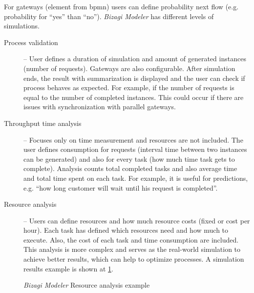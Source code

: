 For gateways (element from \gls{bpmn}) users can define probability next flow (e.g. probability for ``yes'' than ``no''). \textit{Bizagi Modeler} has different levels of simulations.
    \begin{description}
        \item[Process validation] -- User defines a duration of simulation and amount of generated instances (number of requests). Gateways are also configurable. After simulation ends, the result with summarization is displayed and the user can check if process behaves as expected. For example, if the number of requests is equal to the number of completed instances. This could occur if there are issues with synchronization with parallel gateways.
        \item[Throughput time analysis] -- Focuses only on time measurement and resources are not included. The user defines consumption for requests (interval time between two instances can be generated) and also for every task (how much time task gets to complete). Analysis counts total completed tasks and also average time and total time spent on each task. For example, it is useful for predictions, e.g. ``how long customer will wait until his request is completed''.
        \item[Resource analysis] -- Users can define resources and how much resource costs (fixed or cost per hour). Each task has defined which resources need and how much to execute. Also, the cost of each task and time consumption are included. This analysis is more complex and serves as the real-world simulation to achieve better results, which can help to optimize processes. A simulation results example is shown at \cref{fig:bizagi-example}.
    \end{description}

\begin{figure}[ht!]
    \centering
    \qquad
    \caption{\textit{Bizagi Modeler} Resource analysis example\cite{bizagi-2018}}%
    \label{fig:bizagi-example}%
\end{figure}
